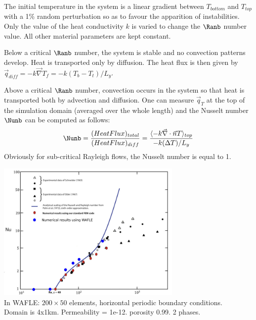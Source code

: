 The initial temperature in the system is a linear gradient between $T_{bottom}$ and $T_{top}$ with a 1\% random perturbation so as to favour the apparition of instabilities.
Only the value of the heat conductivity $k$ is varied to change the $\Ranb$ number value. All other material parameters are kept constant.

Below a critical $\Ranb$ number, the system is stable and no convection patterns develop. Heat is transported only by diffusion.
The heat flux is then given by $\vec{q}_{diff}=-k \vec{\nabla} T_f=-k (T_b-T_t)/L_y$.


Above a critical $\Ranb$ number, convection occurs in the system so that heat is transported both by advection and diffusion. 
One can measure $\vec{q}_T$ at the top of the simulation domain (averaged over the whole length) and the Nusselt number $\Nunb$ can be computed as follows:
\[
\Nunb=\frac{(Heat Flux)_{total}}{(Heat Flux)_{diff}} 
= \frac{\langle-k \vec{\nabla}\cdot \vec{n} T\rangle_{top}}{ -k (\Delta T)/L_y}
\]
Obviously for sub-critical Rayleigh flows, the Nusselt number is equal to 1. 

\begin{center}
\includegraphics[width=9cm]{python_codes/fieldstone_107/images/NuRa2}\\
In WAFLE: $200 \times 50$ elements, horizontal periodic boundary conditions.\\ Domain is 4x1km. Permeability = 1e-12. porosity 0.99. 2 phases.  
\end{center}



